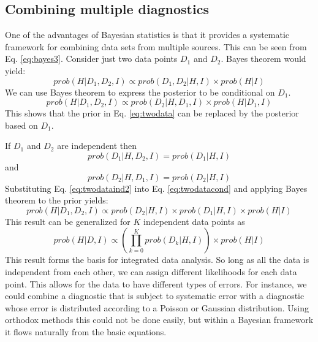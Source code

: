 \documentclass[12pt]{article}
\numberwithin{equation}{section}
\begin{document}
\subsection{Combining multiple diagnostics}
One of the advantages of Bayesian statistics is that it provides a systematic framework for combining data sets from multiple sources. 
This can be seen from Eq. \ref{eq:bayes3}. Consider just two data points $D_1$ and $D_2$. Bayes theorem would yield:
\begin{equation} \label{eq:twodata}
	prob(H|D_1,D_2,I) \propto prob(D_1,D_2|H,I) \times prob(H|I)
\end{equation}
We can use Bayes theorem to express the posterior to be conditional on $D_1$.
\begin{equation} \label{eq:twodatacond}
	prob(H|D_1,D_2,I) \propto prob(D_2|H,D_1,I) \times prob(H|D_1,I)
\end{equation}
This shows that the prior in Eq. \ref{eq:twodata} can be replaced by the posterior based on $D_1$. 

If $D_1$ and $D_2$ are independent then
\begin{equation} \label{eq:twodataind1}
	prob(D_1|H,D_2,I) = prob(D_1|H,I)
\end{equation}
and
\begin{equation} \label{eq:twodataind2}
	prob(D_2|H,D_1,I) = prob(D_2|H,I)
\end{equation}
Substituting Eq. \ref{eq:twodataind2} into Eq. \ref{eq:twodatacond} and applying Bayes theorem to the prior yields:
\begin{equation} \label{eq:twodataexpand}
	prob(H|D_1,D_2,I) \propto prob(D_2|H,I) \times prob(D_1|H,I) \times prob(H|I)
\end{equation}
This result can be generalized for $K$ independent data points as 
\begin{equation} \label{eq:IDA}
	{prob(H|D,I)} \propto {\left( \prod\limits_{k=0}^K{prob(D_k|H,I)}\right)} \times {prob(H|I)}
\end{equation}
This result forms the basis for integrated data analysis. So long as all the data is independent from each other, we can assign 
different likelihoods for each data point. This allows for the data to have different types of errors. For instance, we could combine 
a diagnostic that is subject to systematic error with a diagnostic whose error is distributed according to a Poisson or Gaussian 
distribution. Using orthodox methods this could not be done easily, but within a Bayesian framework it flows naturally from the 
basic equations. 
\end{document}
